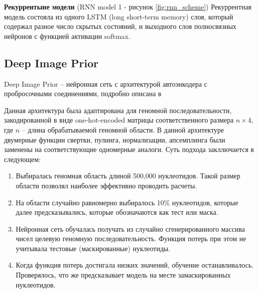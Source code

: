 {\bfseries Рекуррентыне модели } (RNN model 1 - рисунок \ref{fig:rnn_scheme}) Рекуррентная модель состояла из одного LSTM (long short-term memory) слоя, который содержал разное число скрытых состояний, и выходного слоя полносвязных нейронов с функцией активации softmax. 



\subsection{Deep Image Prior}
Deep Image Prior --  нейронная сеть с архитектурой автоэнкодера с пробросочными соединениями, подробно описана в \cite{ulyanov_deep_2018}

Данная архитектура была адаптирована для геномной последовательности, закодированной в виде one-hot-encoded матрицы соответственного размера $n\times 4$, где $n$ – длина обрабатываемой геномной области.
В данной архитектуре двумерные функции свертки, пулинга, нормализации, апсемплинга были заменены на соответствующие одномерные аналоги.
Суть подхода закллючается в следующем:

\begin{enumerate}
	\item Выбиралась геномная область длиной 500,000 нуклеотидов. Такой размер области позволял наиболее эффективно проводить расчеты.
	\item На области случайно равномерно выбиралось  10\% нуклеотидов, которые далее предсказывались, которые обозначаются как тест или маска.
	\item Нейронная сеть обучалась получать из случайно сгенерированного массива чисел целевую геномную последовательность. Функция потерь при этом не учитывала тестовые (маскированные) нуклеотиды.
	\item Когда функция потерь достигала низких значений, обучение останавливалось. Проверялось, что же предсказывает модель на месте замаскированных нуклеотидов.
\end{enumerate} 



